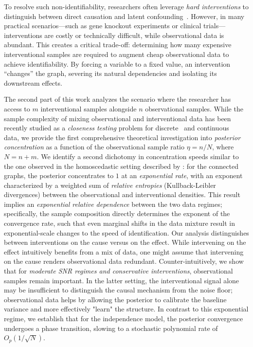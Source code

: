 \documentclass[accepted]{uai2026} %
\theoremstyle{boldremark}
\begin{document}
To resolve such non-identifiability, researchers often leverage \textit{hard interventions} to distinguish between direct causation and latent confounding~\citet{pearl2009causality}. However, in many practical scenarios---such as gene knockout experiments or clinical trials---interventions are costly or technically difficult, while observational data is abundant. This creates a critical trade-off: determining how many expensive interventional samples are required to augment cheap observational data to achieve identifiability. By forcing a variable to a fixed value, an intervention ``changes'' the graph, severing its natural dependencies and isolating its downstream effects. 


The second part of this work analyzes the scenario where the researcher has access to $m$ interventional samples alongside $n$ observational samples. While the sample complexity of mixing observational and interventional data has been recently studied as a \textit{closeness testing} problem for discrete~\citet{acharya23b} and continuous~\citet{jamshidi2025samplecomplexitynonparametriccloseness} data, we provide the first comprehensive theoretical investigation into \textit{posterior concentration} as a function of the observational sample ratio $\eta = n/N$, where $N = n+m$. We identify a second dichotomy in concentration speeds similar to the one observed in the homoscedastic setting described by \cite{lungu2025bayesiancausaldiscoveryposterior}: for the connected graphs, the posterior concentrates to $1$ at an \textit{exponential rate}, with an exponent characterized by a weighted sum of \textit{relative entropies} (Kullback-Leibler divergences) between the observational and interventional densities. This result implies an  \textit{exponential relative dependence}  between the two data regimes; specifically, the sample composition directly determines the exponent of the convergence rate, such that even marginal shifts in the data mixture result in exponential-scale changes to the speed of identification. Our analysis distinguishes between interventions on the cause versus on the effect. While intervening on the effect intuitively benefits from a mix of data, one might assume that intervening on the cause renders observational data redundant. Counter-intuitively, we show that for \textit{moderate SNR regimes and conservative interventions}, observational samples remain important. In the latter setting, the interventional signal alone may be insufficient to distinguish the causal mechanism from the noise floor; observational data helps by allowing the posterior to calibrate the baseline variance and more effectively "learn" the structure.   In contrast to this exponential regime, we establish that for the independence model, the posterior convergence undergoes a phase transition, slowing to a stochastic polynomial rate of $O_p(1/\sqrt{N})$. 
\end{document}
